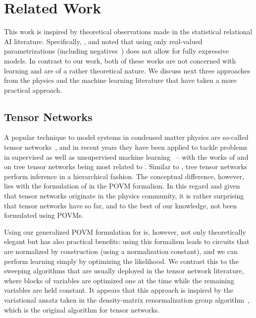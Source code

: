 \section{Related Work}
\label{sec:related}

This work is inspired by theoretical observations made in the statistical relational AI literature. Specifically, \citet{buchman2017rules}, and \citet{kuzelka2020complex} noted that using only real-valued parametrizations (including negatives~\citep{buchman2017negative}) does not allow for fully expressive models.
In contrast to our work, both of these works are not concerned with learning and are of a rather theoretical nature.
We discuss next three approaches from the physics and the machine learning literature that have taken a more practical approach.


\subsection*{Tensor Networks}

A popular technique to model systems in condensed matter physics are so-called tensor networks~\citep{orus2014practical,white1992density}, and in recent years they have been applied to tackle problems in supervised as well as unsupervised machine learning~\citep{cheng2019tree,han2018unsupervised,stoudenmire2016supervised} -- with the works of \citet{han2018unsupervised} and \citet{cheng2019tree} on tree tensor networks being most related to \pocs. Similar to \pocs, tree tensor networks perform inference in a hierarchical fashion. The conceptual difference, however, lies with the formulation of \pocs in the POVM formalism. In this regard and given that tensor networks originate in the physics community, it is rather surprising that tensor networks have so far, and to the best of our knowledge, not been formulated using POVMs.

Using our generalized POVM formulation for \pocs is, however, not only theoretically elegant but has also practical benefits: using this formalism leads to circuits that are normalized by construction (using a normalization constant), and we can perform learning simply by optimizing the likelihood. We contrast this to the sweeping algorithms that are usually deployed in the tensor network literature, where blocks of variables are optimized one at the time while the remaining variables are held constant. It appears that this approach is inspired by the variational ansatz taken in the density-matrix renormalization group algorithm~\citep{white1992density}, which is the original algorithm for tensor networks.

